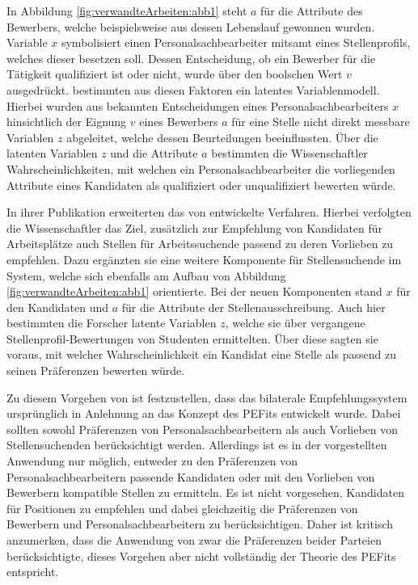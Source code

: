 In Abbildung \ref{fig:verwandteArbeiten:abb1} steht $a$ für die Attribute des Bewerbers, welche beispielsweise aus dessen Lebenslauf gewonnen wurden. Variable $x$ symbolisiert einen Personalsachbearbeiter mitsamt eines Stellenprofils, welches dieser besetzen soll. Dessen Entscheidung, ob ein Bewerber für die Tätigkeit qualifiziert ist oder nicht, wurde über den boolschen Wert $v$ ausgedrückt. \textcite[S. 4ff.]{faerber:2003} bestimmten aus diesen Faktoren ein latentes Variablenmodell. Hierbei wurden aus bekannten Entscheidungen eines Personalsachbearbeiters $x$ hinsichtlich der Eignung $v$ eines Bewerbers $a$ für eine Stelle nicht direkt messbare Variablen $z$ abgeleitet, welche dessen Beurteilungen beeinflussten. Über die latenten Variablen $z$ und die Attribute $a$ bestimmten die Wissenschaftler Wahrscheinlichkeiten, mit welchen ein Personalsachbearbeiter die vorliegenden Attribute eines Kandidaten als qualifiziert oder unqualifiziert bewerten würde.

In ihrer Publikation erweiterten \textcite[S. 4f.]{malinowski:2006} das von \textcite[S. 4ff.]{faerber:2003} entwickelte Verfahren. Hierbei verfolgten die Wissenschaftler das Ziel, zusätzlich zur Empfehlung von Kandidaten für Arbeitsplätze auch Stellen für Arbeitssuchende passend zu deren Vorlieben zu empfehlen. Dazu ergänzten sie eine weitere Komponente für Stellensuchende im System, welche sich ebenfalls am Aufbau von Abbildung \ref{fig:verwandteArbeiten:abb1} orientierte. Bei der neuen Komponenten stand $x$ für den Kandidaten und $a$ für die Attribute der Stellenausschreibung. Auch hier bestimmten die Forscher latente Variablen $z$, welche sie über vergangene Stellenprofil-Bewertungen von Studenten ermittelten. Über diese sagten sie voraus, mit welcher Wahrscheinlichkeit ein Kandidat eine Stelle als passend zu seinen Präferenzen bewerten würde. 

Zu diesem Vorgehen von \textcite[S. 3ff.]{malinowski:2006} ist festzustellen, dass das bilaterale Empfehlungssystem ursprünglich in Anlehnung an das Konzept des \acp{PEFit} entwickelt wurde. Dabei sollten sowohl Präferenzen von Personalsachbearbeitern als auch Vorlieben von Stellensuchenden berücksichtigt werden. Allerdings ist es in der vorgestellten Anwendung nur möglich, entweder zu den Präferenzen von Personalsachbearbeitern passende Kandidaten oder mit den Vorlieben von Bewerbern kompatible Stellen zu ermitteln. Es ist nicht vorgesehen, Kandidaten für Positionen zu empfehlen und dabei gleichzeitig die Präferenzen von Bewerbern und Personalsachbearbeitern zu berücksichtigen. Daher ist kritisch anzumerken, dass die Anwendung von \textcite[S. 3ff.]{malinowski:2006} zwar die Präferenzen beider Parteien berücksichtigte, dieses Vorgehen aber nicht vollständig der Theorie des \acp{PEFit} entspricht.

